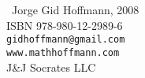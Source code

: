 \newpage
\thispagestyle{empty}

\vspace*{3cm}
\begin{center}
{\small
  \textcopyright\ Jorge Gid Hoffmann, 2008 \\[10pt]
  ISBN 978-980-12-2989-6 \\[10pt]
  \texttt{gidhoffmann@gmail.com} \\[4pt]
  \texttt{www.mathhoffmann.com} \\[10pt]
  J\&J Socrates LLC
}
\end{center}

\vfill
\newpage
